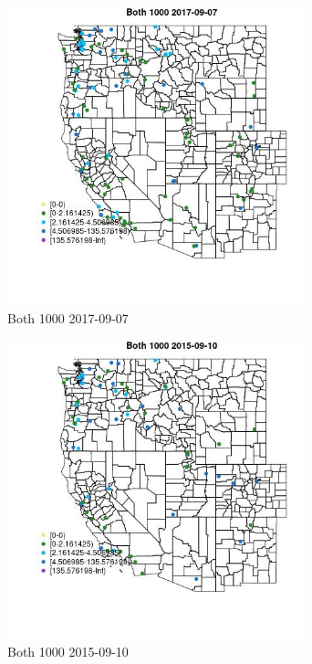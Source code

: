 \begin{figure} 
\centering  
\includegraphics[width=0.77\textwidth]{Code_Outputs/Report_ML_input_PM25_Step4_part_e_de_duplicated_aveswNAs_MapObsBoth_10002017-09-07.jpg} 
\caption{\label{fig:Report_ML_input_PM25_Step4_part_e_de_duplicated_aveswNAsMapObsBoth_10002017-09-07}Both 1000 2017-09-07} 
\end{figure} 
 

\begin{figure} 
\centering  
\includegraphics[width=0.77\textwidth]{Code_Outputs/Report_ML_input_PM25_Step4_part_e_de_duplicated_aveswNAs_MapObsBoth_10002015-09-10.jpg} 
\caption{\label{fig:Report_ML_input_PM25_Step4_part_e_de_duplicated_aveswNAsMapObsBoth_10002015-09-10}Both 1000 2015-09-10} 
\end{figure} 
 

